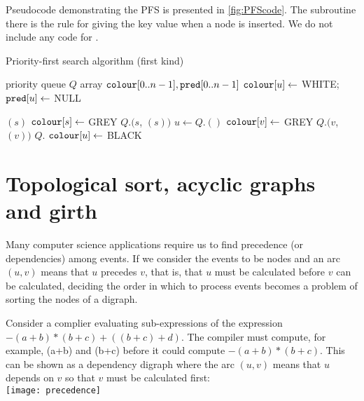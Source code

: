 Pseudocode demonstrating the PFS is presented in
\cref{fig:PFScode}. The subroutine  there is the
rule for giving the key value when a node is inserted. We do not include
any code for .

\begin{algorithm}[H]
  \caption{Priority-first search algorithm (first kind)}
  \label{fig:PFScode}
\begin{algorithmic}[1]
	\State priority queue $Q$  
	\State array $\colour[0..n-1], \pred[0..n-1]$
		\State $\colour[u] \gets $ WHITE; $\pred[u] \gets $ NULL
	\EndFor
	
			\State {}$(s)$
		\EndIf
	\EndFor
	\State \Return{$\pred$}
\EndFunction
{}
	\State $\colour[s] \gets $ GREY 
	\State $Q$.$(s$, $(s))$
		\State $u \gets Q$.$()$
			\State $\colour[v] \gets $ GREY
			\State $Q$.$(v$, $(v))$
		\Else
			\State $Q$.
			\State $\colour[u] \gets$ BLACK
		\EndIf
	\EndWhile
\EndFunction
\end{algorithmic}
\end{algorithm}


\chapter{Topological sort, acyclic graphs and girth}

Many computer science applications require us to find precedence (or dependencies) among events. If we consider the events to be nodes and an arc $(u,v)$ means that $u$ precedes $v$, that is, that $u$ must be calculated before $v$ can be calculated, deciding the order in which to process events becomes a problem of sorting the nodes of a digraph.

%
\begin{Boxample}[0]
Consider a complier evaluating sub-expressions of the expression $-(a+b) * (b+c) + ((b+c)+d)$.  The compiler must compute, for example, (a+b) and (b+c) before it could compute $-(a+b) * (b+c)$. This can be shown as a dependency digraph where the arc $(u,v)$ means that $u$ depends on $v$ so that $v$ must be calculated first:\\
\texttt{[image: precedence]}
\end{Boxample}

